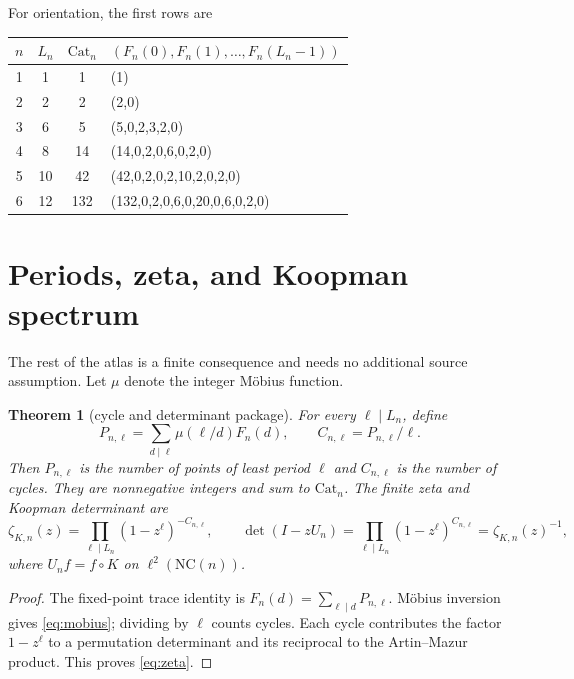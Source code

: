\documentclass[11pt]{article}
\newtheorem{theorem}{Theorem}[section]
\theoremstyle{definition}
\newcommand{\NC}{\mathrm{NC}}
\newcommand{\Cat}{\mathrm{Cat}}
\begin{document}
For orientation, the first rows are
\begin{center}
\begin{tabular}{c|c|c|l}
\toprule
$n$ & $L_n$ & $\Cat_n$ & $(F_n(0),F_n(1),\ldots,F_n(L_n-1))$\\
\midrule
1&1&1&(1)\\
2&2&2&(2,0)\\
3&6&5&(5,0,2,3,2,0)\\
4&8&14&(14,0,2,0,6,0,2,0)\\
5&10&42&(42,0,2,0,2,10,2,0,2,0)\\
6&12&132&(132,0,2,0,6,0,20,0,6,0,2,0)\\
\bottomrule
\end{tabular}
\end{center}

\section{Periods, zeta, and Koopman spectrum}

The rest of the atlas is a finite consequence and needs no additional source
assumption.  Let $\mu$ denote the integer Möbius function.

\begin{theorem}[cycle and determinant package]\label{thm:cycles}
For every $\ell\mid L_n$, define
\begin{equation}
 P_{n,\ell}=\sum_{d\mid\ell}\mu(\ell/d)F_n(d),
 \qquad C_{n,\ell}=P_{n,\ell}/\ell.                    \label{eq:mobius}
\end{equation}
Then $P_{n,\ell}$ is the number of points of least period $\ell$ and
$C_{n,\ell}$ is the number of cycles.  They are nonnegative integers and sum
to $\Cat_n$.  The finite zeta and Koopman determinant are
\begin{equation}
 \zeta_{K,n}(z)=\prod_{\ell\mid L_n}(1-z^\ell)^{-C_{n,\ell}},\qquad
 \det(I-zU_n)=\prod_{\ell\mid L_n}(1-z^\ell)^{C_{n,\ell}}
 =\zeta_{K,n}(z)^{-1},                                      \label{eq:zeta}
\end{equation}
where $U_nf=f\circ K$ on $\ell^2(\NC(n))$.
\end{theorem}

\begin{proof}
The fixed-point trace identity is $F_n(d)=\sum_{\ell\mid d}P_{n,\ell}$.
Möbius inversion gives \eqref{eq:mobius}; dividing by $\ell$ counts cycles.
Each cycle contributes the factor $1-z^\ell$ to a permutation determinant and
its reciprocal to the Artin--Mazur product.  This proves \eqref{eq:zeta}.
\end{proof}
\end{document}
